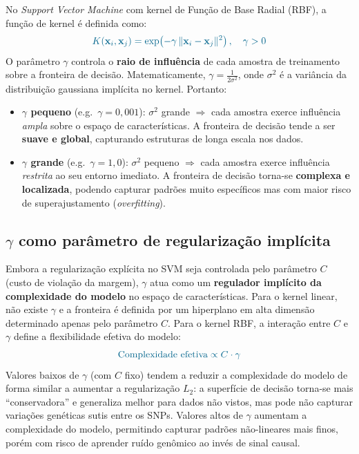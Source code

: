 \documentclass[12pt,a4paper]{article}
\newcommand{\novo}[1]{\textcolor{corNova}{#1}}
\begin{document}
\novo{No \textit{Support Vector Machine} com kernel de Função de Base Radial (RBF), a função de kernel é definida como:}
\[
  \novo{K(\mathbf{x}_i, \mathbf{x}_j) = \exp\!\left(-\gamma \,\|\mathbf{x}_i - \mathbf{x}_j\|^2\right), \quad \gamma > 0}
\]
\novo{O parâmetro $\gamma$ controla o \textbf{raio de influência} de cada amostra de treinamento sobre a fronteira de decisão. Matematicamente, $\gamma = \frac{1}{2\sigma^2}$, onde $\sigma^2$ é a variância da distribuição gaussiana implícita no kernel. Portanto:}
\begin{itemize}
  \item \novo{\textbf{$\gamma$ pequeno} (e.g.\ $\gamma = 0{,}001$): $\sigma^2$ grande $\Rightarrow$ cada amostra exerce influência \emph{ampla} sobre o espaço de características. A fronteira de decisão tende a ser \textbf{suave e global}, capturando estruturas de longa escala nos dados.}
  \item \novo{\textbf{$\gamma$ grande} (e.g.\ $\gamma = 1{,}0$): $\sigma^2$ pequeno $\Rightarrow$ cada amostra exerce influência \emph{restrita} ao seu entorno imediato. A fronteira de decisão torna-se \textbf{complexa e localizada}, podendo capturar padrões muito específicos mas com maior risco de superajustamento (\textit{overfitting}).}
\end{itemize}

\novo{\subsection*{$\gamma$ como parâmetro de regularização implícita}}

\novo{Embora a regularização explícita no SVM seja controlada pelo parâmetro $C$ (custo de violação da margem), $\gamma$ atua como um \textbf{regulador implícito da complexidade do modelo} no espaço de características. Para o kernel linear, não existe $\gamma$ e a fronteira é definida por um hiperplano em alta dimensão determinado apenas pelo parâmetro $C$. Para o kernel RBF, a interação entre $C$ e $\gamma$ define a flexibilidade efetiva do modelo:}
\[
  \novo{\text{Complexidade efetiva} \propto C \cdot \gamma}
\]
\novo{Valores baixos de $\gamma$ (com $C$ fixo) tendem a reduzir a complexidade do modelo de forma similar a aumentar a regularização $L_2$: a superfície de decisão torna-se mais ``conservadora'' e generaliza melhor para dados não vistos, mas pode não capturar variações genéticas sutis entre os SNPs. Valores altos de $\gamma$ aumentam a complexidade do modelo, permitindo capturar padrões não-lineares mais finos, porém com risco de aprender ruído genômico ao invés de sinal causal.}
\end{document}
